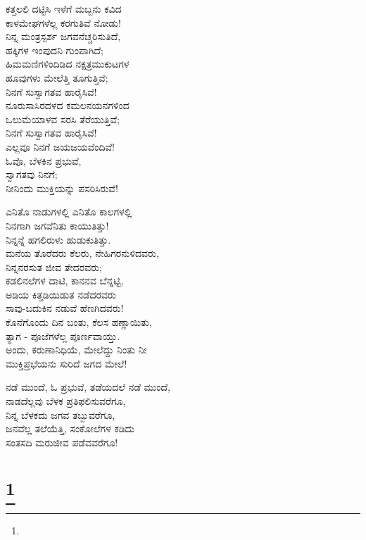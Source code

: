 \begin{myquote}
ಕತ್ತಲಲಿ ದಟ್ಟಿಸಿ ಇಳೆಗೆ ಮಬ್ಬನು ಕವಿದ\\ಕಾಳಮೇಘಗಳೆಲ್ಲ ಕರಗುತಿವೆ ನೋಡು!\\ನಿನ್ನ ಮಂತ್ರಸ್ಪರ್ಶ ಜಗವನೆಚ್ಚರಿಸುತಿದೆ,\\ಹಕ್ಕಿಗಳ ಇಂಪುದನಿ ಗುಂಪಾಗಿದೆ;\\ಹಿಮಮಣಿಗಳಿಂದಿಡಿದ ನಕ್ಷತ್ರಮುಕುಟಗಳ\\ಹೂವುಗಳು ಮೇಲೆತ್ತಿ ತೂಗುತ್ತಿವೆ;\\ನಿನಗೆ ಸುಸ್ವಾಗತವ ಹಾರೈಸಿವೆ!\\ನೂರುಸಾಸಿರದಳದ ಕಮಲನಯನಗಳಿಂದ\\ಒಲುಮೆಯಾಳವ ಸರಸಿ ತೆರೆಯುತ್ತಿವೆ;\\ನಿನಗೆ ಸುಸ್ವಾಗತವ ಹಾರೈಸಿವೆ!\\ಎಲ್ಲವೂ ನಿನಗೆ ಜಯಜಯವೆಂದಿವೆ!\\ಓವೊ, ಬೆಳಕಿನ ಪ್ರಭುವೆ,\\ಸ್ವಾಗತವು ನಿನಗೆ;\\ನೀನಿಂದು ಮುಕ್ತಿಯನ್ನು ಪಸರಿಸಿರುವೆ!
\end{myquote}

\begin{myquote}
ಎನಿತೊ ನಾಡುಗಳಲ್ಲಿ ಎನಿತೊ ಕಾಲಗಳಲ್ಲಿ\\ನಿನಗಾಗಿ ಜಗವೆನಿತು ಕಾಯುತಿತ್ತು!\\ನಿನ್ನನ್ನೆ ಹಗಲಿರುಳು ಹುಡುಕುತಿತ್ತು.\\ಮನೆಯ ತೊರೆದರು ಕೆಲರು, ನೇಹಿಗರನುಳಿದವರು,\\ನಿನ್ನನರಸುತ ಜೀವ ತೇದರವರು;\\ಕಡಲಿನಲೆಗಳ ದಾಟಿ, ಕಾನನವ ಬೆನ್ನಟ್ಟಿ,\\ಅಡಿಯ ಕಿತ್ತಡಿಯಿಡುತ ನಡೆದರವರು\\ಸಾವು-ಬದುಕಿನ ನಡುವೆ ಹೆಣಗಿದವರು!\\ಕೊನೆಗೊಂದು ದಿನ ಬಂತು, ಕೆಲಸ ಹಣ್ಣಾಯಿತು,\\ತ್ಯಾಗ - ಪೂಜೆಗಳೆಲ್ಲ ಪೂರ್ಣವಾಯ್ತು.\\
ಅಂದು, ಕರುಣಾನಿಧಿಯೆ, ಮೇಲೆದ್ದು ನಿಂತು ನೀ\\ಮುಕ್ತಿಪ್ರಭೆಯನು ಸುರಿದೆ ಜಗದ ಮೇಲೆ!
\end{myquote}

\begin{myquote}
ನಡೆ ಮುಂದೆ, ಓ ಪ್ರಭುವೆ, ತಡೆಯದಲೆ ನಡೆ ಮುಂದೆ,\\ನಾಡದೆಲ್ಲವು ಬೆಳಕ ಪ್ರತಿಫಲಿಸುವರೆಗೂ,\\ನಿನ್ನ ಬೆಳಕದು ಜಗವ ತಬ್ಬುವರೆಗೂ,\\ಜನವೆಲ್ಲ ತಲೆಯೆತ್ತಿ, ಸಂಕೋಲೆಗಳ ಕಡಿದು\\ಸಂತಸದಿ ಮರುಜೀವ ಪಡೆವವರೆಗೂ!
\end{myquote}

\selecteng

\chapter[THOU BLESSED DREAM]{\protect\footnote{}}

